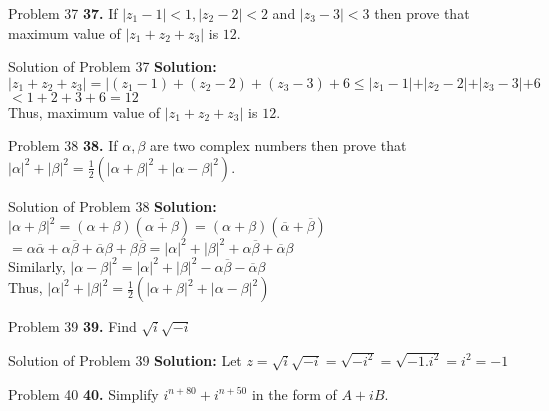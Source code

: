 \documentclass[aspectratio=169,8pt]{beamer}
\begin{document}
\begin{frame}{Problem 37}
  \textbf{37.} If $|z_1 - 1| < 1, |z_2- 2|< 2$ and $|z_3 - 3| < 3$ then prove that maximum value of $|z_1 + z_2 + z_3|$ is $12.$
\end{frame}
\begin{frame}{Solution of Problem 37}
  \textbf{Solution:} $|z_1 + z_2 + z_3| = |(z_1 - 1) + (z_2 - 2) + (z_3 - 3) + 6\leq |z_1 - 1| + |z_2 - 2| + |z_3 - 3| + 6$\\
  \vspace*{0.2cm}
  $< 1 + 2+ 3 + 6 = 12$\\
  \vspace*{0.2cm}
  Thus, maximum value of $|z_1 + z_2 + z_3|$ is $12.$
\end{frame}
\begin{frame}{Problem 38}
  \textbf{38.} If $\alpha, \beta$ are two complex numbers then prove that $|\alpha|^2 + |\beta|^2 = \frac{1}{2}(|\alpha + \beta|^2 + |\alpha - \beta|^2).$
\end{frame}
\begin{frame}{Solution of Problem 38}
  \textbf{Solution:} $|\alpha + \beta|^2 = (\alpha + \beta)(\overline{\alpha + \beta}) = (\alpha + \beta)(\overline{\alpha} + \overline{\beta})$\\
  \vspace*{0.2cm}
  $= \alpha\overline{\alpha} + \alpha\overline{\beta} + \overline{\alpha}\beta + \beta\overline{\beta} = |\alpha|^2 + |\beta|^2 + \alpha\overline{\beta} + \overline{\alpha}\beta$\\
  \vspace*{0.2cm}
  Similarly, $|\alpha - \beta|^2 = |\alpha|^2 + |\beta|^2 - \alpha\overline{\beta} - \overline{\alpha}\beta$\\
  \vspace*{0.2cm}
  Thus, $|\alpha|^2 + |\beta|^2 = \frac{1}{2}(|\alpha + \beta|^2 + |\alpha - \beta|^2)$
\end{frame}
\begin{frame}{Problem 39}
  \textbf{39.} Find $\sqrt{i}\sqrt{-i}$
\end{frame}
\begin{frame}{Solution of Problem 39}
  \textbf{Solution:} Let $z = \sqrt{i}\sqrt{-i} = \sqrt{-i^2} = \sqrt{-1.i^2} = i^2 = -1$
\end{frame}
\begin{frame}{Problem 40}
  \textbf{40.} Simplify $i^{n + 80} + i^{n + 50}$ in the form of $A + iB.$
\end{frame}
\end{document}
